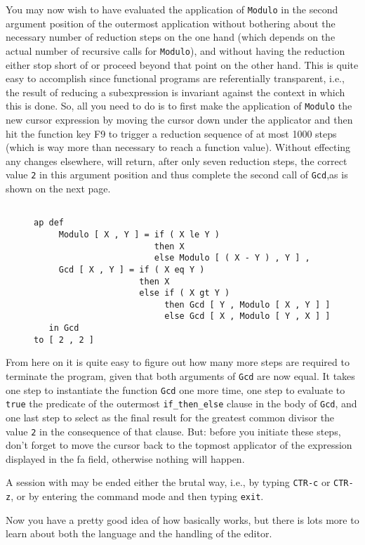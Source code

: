 You  may now wish to have evaluated 
the application of {\tt Modulo} in the second argument
position of the outermost application without bothering about the necessary
number of
reduction steps on the one hand (which depends on the actual number of
recursive calls for {\tt Modulo}), and without
having the reduction either stop short of or proceed beyond that point on the
other hand. This is quite easy to accomplish since functional programs are {\mys referentially 
transparent}, i.e., the result of reducing a subexpression
is invariant against the context in which this is done. So, all you need
to do is to first make the application of {\tt Modulo} the new cursor
expression by moving the cursor down under the applicator and then  hit
the function key F9 to trigger a reduction sequence of at most 1000 steps 
(which is way more than necessary to reach a function value). Without
effecting any changes elsewhere,
\pired will return, after only seven reduction steps, the correct value {\tt 2} in
 this argument position and thus complete the second call of {\tt Gcd},as is shown on the next page.

\begin{figure}
\begin{verbatim}

ap def 
     Modulo [ X , Y ] = if ( X le Y )
                        then X
                        else Modulo [ ( X - Y ) , Y ] ,
     Gcd [ X , Y ] = if ( X eq Y )
                     then X
                     else if ( X gt Y )
                          then Gcd [ Y , Modulo [ X , Y ] ]
                          else Gcd [ X , Modulo [ Y , X ] ]
   in Gcd
to [ 2 , 2 ]

\end{verbatim}
\end{figure}
From here on it is quite easy to figure out how many more steps are
required to terminate the program, given that both arguments of
{\tt Gcd} are now equal. It takes one step to instantiate
 the function {\tt Gcd}  one more time, one step to evaluate to {\tt true}
the predicate of the outermost {\tt if\_then\_else} clause in the body of
{\tt Gcd}, and one last step to select as the final result for the greatest
common divisor the value {\tt 2} in the consequence of that clause.
But: before you initiate these steps, don't forget to move the cursor
back to the topmost applicator of
 the expression displayed in the {\sc fa} field, otherwise nothing will happen.

 A session with \pired may be ended either the brutal way, i.e., by typing
{\tt CTR-c} or {\tt CTR-z}, or by entering the command mode and
 then typing {\tt exit}.

Now you have a pretty good idea of how \pired basically works, but
 there is lots more to learn about both the
language \kir and the handling of the editor.

